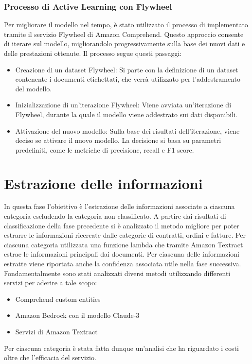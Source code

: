 \subsubsection{Processo di Active Learning con Flywheel}
Per migliorare il modello nel tempo, è stato utilizzato il processo di  implementato tramite il servizio Flywheel di Amazon Comprehend. Questo approccio consente di iterare sul modello, migliorandolo progressivamente sulla base dei nuovi dati e delle prestazioni ottenute. Il processo segue questi passaggi:

\begin{itemize}
    \item Creazione di un dataset Flywheel: Si parte con la definizione di un dataset contenente i documenti etichettati, che verrà utilizzato per l'addestramento del modello.
    \item Inizializzazione di un'iterazione Flywheel: Viene avviata un'iterazione di Flywheel, durante la quale il modello viene addestrato sui dati disponibili.
    \item Attivazione del nuovo modello: Sulla base dei risultati dell'iterazione, viene deciso se attivare il nuovo modello. La decisione si basa su parametri predefiniti, come le metriche di precisione, recall e F1 score.
\end{itemize}

\section{Estrazione delle informazioni}
In questa fase l'obiettivo è l'estrazione delle informazioni associate a ciascuna categoria escludendo la categoria non classificato. A partire dai risultati di classificazione della fase precedente si è analizzato il metodo migliore per poter estrarre le informazioni ricercate dalle categorie di contratti, ordini e fatture. Per ciascuna categoria
utilizzata una funzione lambda che tramite Amazon Textract estrae le informazioni
principali dai documenti. Per ciascuna delle informazioni estratte viene riportata
anche la confidenza associata utile nella fase successiva.\\
Fondamentalmente sono stati analizzati diversi metodi utilizzando differenti servizi per aderire a tale scopo:
\begin{itemize}
    \item Comprehend custom entities
    \item Amazon Bedrock con il modello Claude-3
    \item Servizi di Amazon Textract
\end{itemize}
Per ciascuna categoria è stata fatta dunque un'analisi che ha riguardato i costi oltre che l'efficacia del servizio.\\
